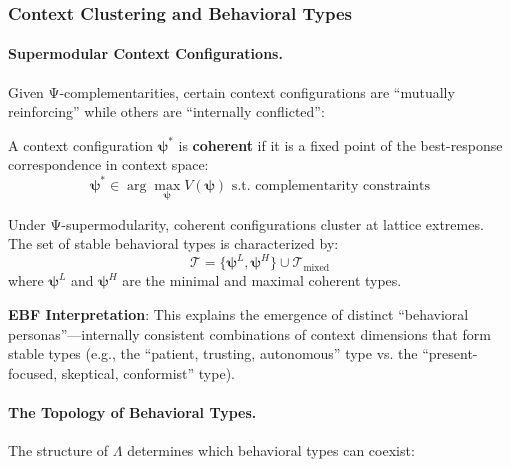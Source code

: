 \subsubsection{Context Clustering and Behavioral Types}

\paragraph{Supermodular Context Configurations.}

Given Ψ-complementarities, certain context configurations are ``mutually reinforcing'' 
while others are ``internally conflicted'':

\begin{definition}
\label{def:coherent-context}
A context configuration $\boldsymbol{\psi}^*$ is \textbf{coherent} if it is a 
fixed point of the best-response correspondence in context space:
\begin{equation}
\boldsymbol{\psi}^* \in \arg\max_{\boldsymbol{\psi}} V(\boldsymbol{\psi}) 
\text{ s.t. complementarity constraints}
\end{equation}
\end{definition}

\begin{proposition}
\label{prop:context-cluster}
Under Ψ-supermodularity, coherent configurations cluster at lattice extremes. 
The set of stable behavioral types is characterized by:
\begin{equation}
\mathcal{T} = \{\boldsymbol{\psi}^L, \boldsymbol{\psi}^H\} \cup \mathcal{T}_{\text{mixed}}
\end{equation}
where $\boldsymbol{\psi}^L$ and $\boldsymbol{\psi}^H$ are the minimal and maximal 
coherent types.
\end{proposition}

\textbf{EBF Interpretation}: This explains the emergence of distinct ``behavioral 
personas''---internally consistent combinations of context dimensions that form 
stable types (e.g., the ``patient, trusting, autonomous'' type vs. the ``present-focused, 
skeptical, conformist'' type).

\paragraph{The Topology of Behavioral Types.}

The structure of $\Lambda$ determines which behavioral types can coexist:

